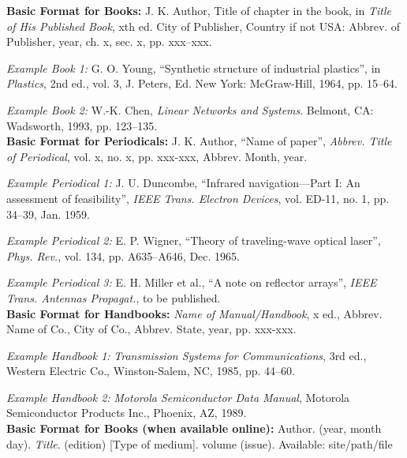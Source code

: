 \documentclass[journal]{IEEEtran}
\begin{document}
\begin{thebibliography}{1}
	 \textbf{Basic Format for Books:} J. K. Author, Title of chapter in the book, in \textit{Title of His Published Book}, xth ed. City of Publisher, Country if not USA: Abbrev. of Publisher, year, ch. x, sec. x, pp. xxx–xxx.
	
	 \textit{Example Book 1:} G. O. Young, “Synthetic structure of industrial plastics”, in \textit{Plastics},  2nd  ed.,  vol.  3,  J.  Peters,  Ed.  New  York: McGraw-Hill, 1964, pp. 15–64.
	
	 \textit{Example Book 2:} W.-K. Chen, \textit{Linear Networks and Systems}. Belmont, CA: Wadsworth, 1993, pp. 123–135.\\
	
	 \textbf{Basic Format for Periodicals:} J. K. Author, “Name of paper”, \textit{Abbrev. Title of Periodical},  vol. x, no. x, pp. xxx-xxx, Abbrev. Month, year.
	
	 \textit{Example Periodical 1:} J. U. Duncombe, “Infrared navigation—Part I: An assessment of feasibility”, \textit{IEEE Trans. Electron Devices}, vol. ED-11, no. 1, pp. 34–39, Jan. 1959.
	
	 \textit{Example Periodical 2:} E. P. Wigner, “Theory of traveling-wave optical laser”, \textit{Phys. Rev.}, vol. 134, pp. A635–A646, Dec. 1965.
	
	 \textit{Example Periodical 3:} E. H. Miller et al., “A note on reflector arrays”,\textit{ IEEE Trans. Antennas Propagat.}, to be published.\\
	
	 \textbf{Basic Format for Handbooks:} \textit{Name of Manual/Handbook}, x ed., Abbrev. Name of Co., City of Co., Abbrev. State, year, pp. xxx-xxx.
	
	 \textit{Example Handbook 1:} \textit{Transmission Systems for Communications}, 3rd ed., Western Electric Co., Winston-Salem, NC, 1985, pp. 44–60.
	
	 \textit{Example Handbook 2:} \textit{Motorola Semiconductor Data Manual}, Motorola Semiconductor Products Inc., Phoenix, AZ, 1989.\\
	
	 \textbf{Basic Format for Books (when available online):} Author. (year, month day). \textit{Title}. (edition) [Type of medium]. volume (issue). Available: site/path/file
	

\end{thebibliography}
\end{document}
